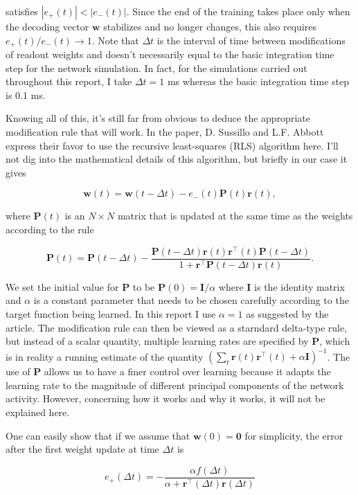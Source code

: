 \noindent
satisfies $|e_+(t)| < |e_-(t)|$. Since the end of the training takes place
only when the decoding vector $\mathbf{w}$ stabilizes and no longer changes,
this also requires $e_+(t)/e_-(t) \rightarrow 1$. 
Note that $\Delta t$ is the interval of time
between modifications of readout weights and doesn't necessarily equal to
the basic integration time step for the network simulation. In fact,
for the simulations carried out throughout this report, I take 
$\Delta t = 1$ ms whereas the basic integration time step is 0.1 ms.

Knowing all of this, it's still far from obvious to deduce the appropriate
modification rule that will work. In the paper, D. Sussillo and L.F. Abbott
express their favor to use the recursive least-squares (RLS) algorithm here.
I'll not dig into the mathematical details of this algorithm, but briefly
in our case it gives

\[\mathbf{w}(t) = \mathbf{w}(t-\Delta t)
                - e_-(t)\mathbf{P}(t)\mathbf{r}(t),\]

\noindent
where $\mathbf{P}(t)$ is an $N \times N$ matrix that is updated at the same
time as the weights according to the rule

\[\mathbf{P}(t) = \mathbf{P}(t-\Delta t) 
  - \frac{\mathbf{P}(t-\Delta t)\mathbf{r}(t)\mathbf{r}^{\top}(t)
    \mathbf{P}(t-\Delta t)}
    {1 + \mathbf{r}^{\top}\mathbf{P}(t-\Delta t)\mathbf{r}(t)}.\]

\noindent
We set the initial value for $\mathbf{P}$ to be 
$\mathbf{P}(0)=\mathbf{I}/\alpha$
where $\mathbf{I}$ is the identity matrix and $\alpha$ is a constant parameter
that needs to be chosen carefully
according to the target function being learned. In this report I use
$\alpha = 1$ as suggested by the article. The modification rule can
then be viewed as a starndard delta-type rule, but instead of a scalar
quantity, multiple learning rates are specified by $\mathbf{P}$, which is
in reality a running estimate of the quantity 
$(\sum_t \mathbf{r}(t)\mathbf{r}^{\top}(t) + \alpha \mathbf{I})^{-1}$.
The use of $\mathbf{P}$ allows us to have a finer control over learning
because it adapts the learning rate to the magnitude of different principal
components of the network activity. However, concerning how it works and
why it works, it will not be explained here.

One can easily show that if we assume that $\mathbf{w}(0) = \mathbf{0}$
for simplicity, the error after the first weight update at time $\Delta t$
is

\[e_+(\Delta t) = - \frac{\alpha f(\Delta t)}
                {\alpha + \mathbf{r}^{\top}(\Delta t)\mathbf{r}(\Delta t)}\]


